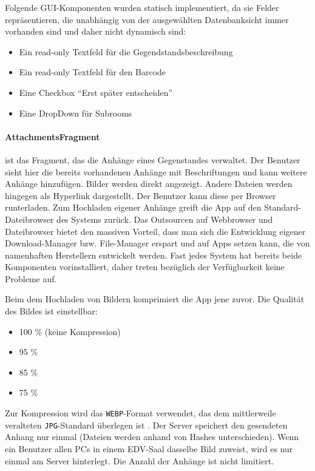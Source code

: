 Folgende GUI-Komponenten wurden statisch implementiert, da sie Felder
repräsentieren, die unabhängig von der ausgewählten Datenbanksicht immer
vorhanden sind und daher nicht dynamisch sind:

\begin{itemize}
\tightlist
\item
  Ein read-only Textfeld für die Gegendstandsbeschreibung
\item
  Ein read-only Textfeld für den Barcode
\item
  Eine Checkbox ``Erst später entscheiden''
\item
  Eine DropDown für Subrooms
\end{itemize}

\hypertarget{attachmentsfragment}{%
\paragraph{AttachmentsFragment}\label{attachmentsfragment}}

ist das Fragment, das die Anhänge eines Gegenstandes verwaltet. Der
Benutzer sieht hier die bereits vorhandenen Anhänge mit Beschriftungen
und kann weitere Anhänge hinzufügen. Bilder werden direkt angezeigt.
Andere Dateien werden hingegen als Hyperlink dargestellt. Der Benutzer
kann diese per Browser runterladen. Zum Hochladen eigener Anhänge greift
die App auf den Standard-Dateibrowser des Systems zurück. Das Outsourcen
auf Webbrowser und Dateibrowser bietet den massiven Vorteil, dass man
sich die Entwicklung eigener Download-Manager bzw. File-Manager erspart
und auf Apps setzen kann, die von namenhaften Herstellern entwickelt
werden. Fast jedes System hat bereits beide Komponenten vorinstalliert,
daher treten bezüglich der Verfügbarkeit keine Probleme auf.

Beim dem Hochladen von Bildern komprimiert die App jene zuvor. Die
Qualität des Bildes ist einstellbar:

\begin{itemize}
\tightlist
\item
  100 \% (keine Kompression)
\item
  95 \%
\item
  85 \%
\item
  75 \%
\end{itemize}

Zur Kompression wird das \texttt{WEBP}-Format verwendet, das dem
mittlerweile veralteten \texttt{JPG}-Standard überlegen ist \cite{webp}.
Der Server speichert den gesendeten Anhang nur einmal (Dateien werden
anhand von Hashes unterschieden). Wenn ein Benutzer allen PCs in einem
EDV-Saal dasselbe Bild zuweist, wird es nur einmal am Server hinterlegt.
Die Anzahl der Anhänge ist nicht limitiert.

